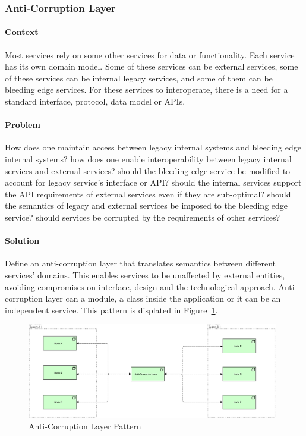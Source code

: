 \documentclass{bmcart}
\begin{document}
\subsubsection{Anti-Corruption Layer}

\paragraph{Context}

Most services rely on some other services for data or functionality. Each service has its own domain model. Some of these services can be external services, some of these services can be internal legacy services, and some of them can be bleeding edge services. For these services to interoperate, there is a need for a standard interface, protocol, data model or APIs.  

\paragraph{Problem}

How does one maintain access between legacy internal systems and bleeding edge internal systems? how does one enable interoperability between legacy internal services and external services? should the bleeding edge service be modified to account for legacy service's interface or API? should the internal services support the API requirements of external services even if they are sub-optimal? should the semantics of legacy and external services be imposed to the bleeding edge service? should services be corrupted by the requirements of other services?  

\paragraph{Solution}

Define an anti-corruption layer that translates semantics between different services' domains. This enables services to be unaffected by external entities, avoiding compromises on interface, design and the technological approach. Anti-corruption layer can a module, a class inside the application or it can be an independent service. This pattern is displated in Figure~\ref{antiCorruption}.


\begin{figure}[h]
  \includegraphics[width=11cm]{Media/Anti-Corruption Layer.jpg}
  \caption{Anti-Corruption Layer Pattern}
  \label{antiCorruption}
\end{figure}
\end{document}
